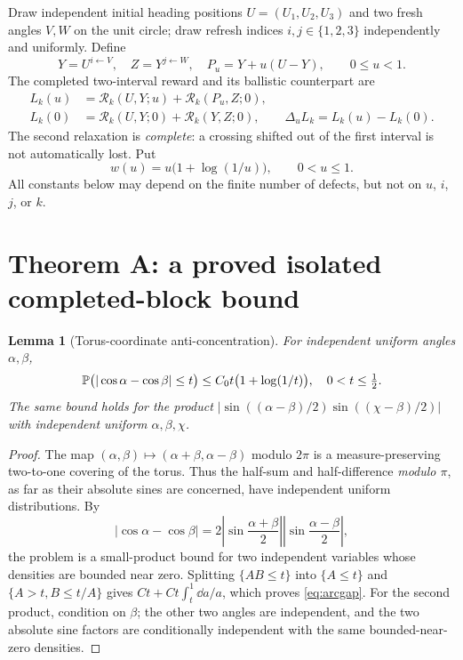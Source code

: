 \documentclass[11pt]{article}
\newtheorem{lemma}[theorem]{Lemma}
\theoremstyle{remark}\newtheorem{remark}[theorem]{Remark}
\newcommand{\R}{\mathcal R}
\begin{document}
Draw independent initial heading positions $U=(U_1,U_2,U_3)$ and two fresh angles $V,W$ on the unit circle; draw refresh indices $i,j\in\{1,2,3\}$ independently and uniformly. Define
\begin{equation}\label{eq:oneblock}
Y=U^{i\leftarrow V},\quad Z=Y^{j\leftarrow W},\quad P_u=Y+u(U-Y),\qquad 0\le u<1.
\end{equation}
The completed two-interval reward and its ballistic counterpart are
\begin{align}\label{eq:Lone}
L_k(u)&=\R_k(U,Y;u)+\R_k(P_u,Z;0),\\
L_k(0)&=\R_k(U,Y;0)+\R_k(Y,Z;0),\qquad \Delta_uL_k=L_k(u)-L_k(0).
\end{align}
The second relaxation is \emph{complete}: a crossing shifted out of the first interval is not automatically lost. Put
\begin{equation}\label{eq:w}
w(u)=u\bigl(1+\log(1/u)\bigr),\qquad 0<u\le1.
\end{equation}
All constants below may depend on the finite number of defects, but not on $u$, $i$, $j$, or $k$.

\section{Theorem A: a proved isolated completed-block bound}
\begin{lemma}[Torus-coordinate anti-concentration]\label{lem:torus}
For independent uniform angles $\alpha,\beta$,
\begin{equation}\label{eq:arcgap}
\mathbb P\bigl(|\cos\alpha-\cos\beta|\le t\bigr)
 \le C_0t\bigl(1+\log(1/t)\bigr),\quad 0<t\le\tfrac12.
\end{equation}
The same bound holds for the product $|\sin((\alpha-\beta)/2)\sin((\chi-\beta)/2)|$ with independent uniform $\alpha,\beta,\chi$.
\end{lemma}
\begin{proof}
The map $(\alpha,\beta)\mapsto (\alpha+\beta,\alpha-\beta)$ modulo $2\pi$ is a measure-preserving two-to-one covering of the torus. Thus the half-sum and half-difference \emph{modulo $\pi$}, as far as their absolute sines are concerned, have independent uniform distributions. By
\[
|\cos\alpha-\cos\beta|=2\left|\sin\frac{\alpha+\beta}{2}\right|\left|\sin\frac{\alpha-\beta}{2}\right|,
\]
the problem is a small-product bound for two independent variables whose densities are bounded near zero. Splitting $\{AB\le t\}$ into $\{A\le t\}$ and $\{A>t,B\le t/A\}$ gives $Ct+Ct\int_t^1\dd a/a$, which proves \eqref{eq:arcgap}. For the second product, condition on $\beta$; the other two angles are independent, and the two absolute sine factors are conditionally independent with the same bounded-near-zero densities.
\end{proof}
\end{document}
